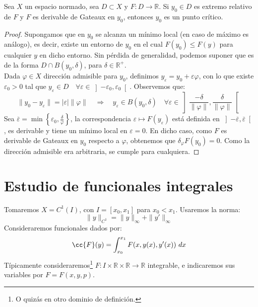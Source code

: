 \begin{prop}
    Sea $X$ un espacio normado, sea $D\subset X$ y $F:D\to \mathbb{R}$. Si $y_0\in D$ es extremo relativo de $F$ y $F$ es derivable de Gateaux en $y_0$, entonces $y_0$ es un punto crítico.
    \begin{proof}
        Supongamos que en $y_0$ se alcanza un mínimo local (en caso de máximo es análogo), es decir, existe un entorno de $y_0$ en el cual $F(y_0)\leq F(y)$ para cualquier $y$ en dicho entorno. Sin pérdida de generalidad, podemos suponer que es de la forma $D\cap B(y_0,\delta)$, para $\delta\in \mathbb{R}^+$.\\

        \noindent
        Dada $\varphi \in X$ dirección admisible para $y_0$, definimos $y_{\varepsilon} = y_0 + \varepsilon\varphi$, con lo que existe $\varepsilon_0>0$ tal que $y_\varepsilon \in D\quad \forall \varepsilon \in \left]-\varepsilon_0,\varepsilon_0\right[$. Observemos que:
        \begin{equation*}
            \|y_0 - y_{\varepsilon}\| = |\varepsilon| \|\varphi\| \quad\Longrightarrow\quad y_{\varepsilon}\in B(y_0,\delta) \quad \forall \varepsilon \in \left]\frac{-\delta}{\|\varphi\|}, \frac{\delta}{\|\varphi\|}\right[
        \end{equation*}
        Sea $\overline{\varepsilon} = \min\left\{\varepsilon_0,\frac{\delta}{\varphi}\right\}$, la correspondencia $\varepsilon\longmapsto F(y_{\varepsilon})$ está definida en $\left]-\overline{\varepsilon},\overline{\varepsilon}\right[$, es derivable y tiene un mínimo local en $\varepsilon=0$. En dicho caso, como $F$ es derivable de Gateaux en $y_0$ respecto a $\varphi$, obtenemos que $\delta_\varphi F(y_0) = 0$. Como la dirección admisible era arbitraria, se cumple para cualquiera.
    \end{proof}
\end{prop}

\section{Estudio de funcionales integrales}
\noindent
Tomaremos $X = C^1(I)$, con $I=[x_0,x_1]$ para $x_0< x_1$. Usaremos la norma:
\begin{equation*}
    \|y\|_{C^1} = \|y\|_\infty + \|y'\|_\infty
\end{equation*}
Consideraremos funcionales dados por: 
\begin{equation*}
    \cc{F}(y) = \int_{x_0}^{x_1} F(x,y(x),y'(x))~dx 
\end{equation*}
Típicamente consideraremos\footnote{O quizás en otro dominio de definición.} $F:I\times\mathbb{R}\times\mathbb{R}\to \mathbb{R}$ integrable, e indicaremos sus variables por $F = F(x,y,p)$. 

